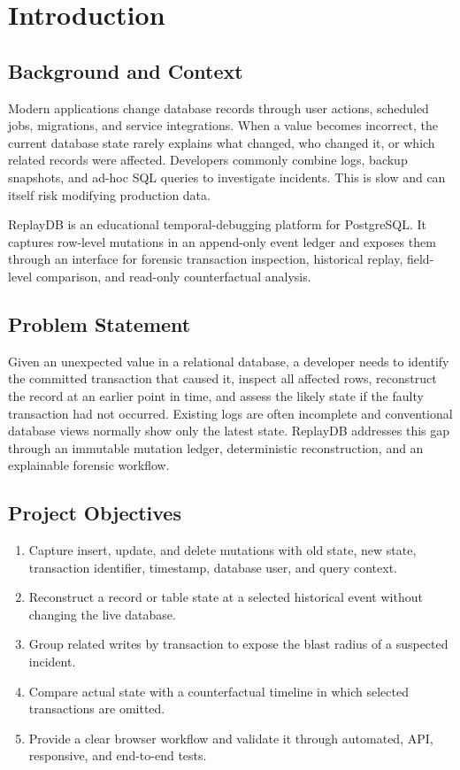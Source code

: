 \documentclass{tietreport}
\author{Harkirat Singh}
\begin{document}
\maketitle
\tableofcontents

\chapter{Introduction}
\section{Background and Context}
Modern applications change database records through user actions, scheduled jobs, migrations, and service integrations. When a value becomes incorrect, the current database state rarely explains what changed, who changed it, or which related records were affected. Developers commonly combine logs, backup snapshots, and ad-hoc SQL queries to investigate incidents. This is slow and can itself risk modifying production data.

ReplayDB is an educational temporal-debugging platform for PostgreSQL. It captures row-level mutations in an append-only event ledger and exposes them through an interface for forensic transaction inspection, historical replay, field-level comparison, and read-only counterfactual analysis.

\section{Problem Statement}
Given an unexpected value in a relational database, a developer needs to identify the committed transaction that caused it, inspect all affected rows, reconstruct the record at an earlier point in time, and assess the likely state if the faulty transaction had not occurred. Existing logs are often incomplete and conventional database views normally show only the latest state. ReplayDB addresses this gap through an immutable mutation ledger, deterministic reconstruction, and an explainable forensic workflow.

\section{Project Objectives}
\begin{enumerate}[label=O\arabic*.]
  \item Capture insert, update, and delete mutations with old state, new state, transaction identifier, timestamp, database user, and query context.
  \item Reconstruct a record or table state at a selected historical event without changing the live database.
  \item Group related writes by transaction to expose the blast radius of a suspected incident.
  \item Compare actual state with a counterfactual timeline in which selected transactions are omitted.
  \item Provide a clear browser workflow and validate it through automated, API, responsive, and end-to-end tests.
\end{enumerate}
\end{document}
